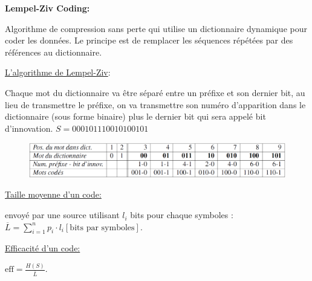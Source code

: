 \textbf{Lempel-Ziv Coding:}

Algorithme de compression sans perte qui utilise un
dictionnaire dynamique pour coder les données. Le principe est de remplacer les
séquences répétées par des références au dictionnaire.

\underline{L'algorithme de Lempel-Ziv}:

Chaque mot du dictionnaire va être séparé entre
un préfixe et son dernier bit, au lieu de transmettre le préfixe, on va transmettre
son numéro d'apparition dans le dictionnaire (sous forme binaire) plus le dernier
bit qui sera appelé bit d'innovation. $S = 000101110010100101$
\setlength{\intextsep}{0pt}
\begin{figure}[H]
    \includegraphics[width=\linewidth]{images/lempel-ziv_table.png}
\end{figure}

\underline{Taille moyenne d'un code:}

envoyé par une source utilisant $l_i$ bits pour chaque symboles :
$\overline{L}=\sum_{i=1}^{n}p_i\cdot l_i[\text{bits par symboles}]$.

\underline{Efficacité d'un code:}

$\text{eff}=\frac{H(S)}{\overline{L}}$.



